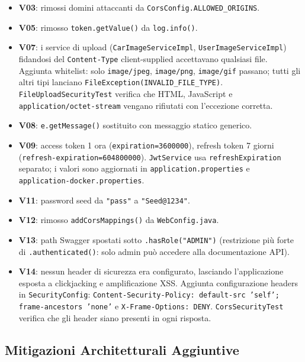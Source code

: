 \documentclass[12pt, a4paper]{article}
\begin{document}
    \begin{itemize}
        \item \textbf{V03}: rimossi domini attaccanti da \texttt{CorsConfig.ALLOWED\_ORIGINS}.
        \item \textbf{V05}: rimosso \texttt{token.getValue()} da \texttt{log.info()}.
        \item \textbf{V07}: i service di upload (\texttt{CarImageServiceImpl},
        \texttt{UserImageServiceImpl}) fidandosi del \texttt{Content-Type} client-supplied
        accettavano qualsiasi file. Aggiunta whitelist: solo \texttt{image/jpeg},
        \texttt{image/png}, \texttt{image/gif} passano; tutti gli altri tipi lanciano
        \texttt{FileException(INVALID\_FILE\_TYPE)}.
        \texttt{FileUploadSecurityTest} verifica che HTML, JavaScript e
        \texttt{application/octet-stream} vengano rifiutati con l'eccezione corretta.
        \item \textbf{V08}: \texttt{e.getMessage()} sostituito con messaggio statico generico.
        \item \textbf{V09}: access token 1 ora (\texttt{expiration=3600000}), refresh token 7 giorni (\texttt{refresh-expiration=604800000}). \texttt{JwtService} usa \texttt{refreshExpiration} separato; i valori sono aggiornati in \texttt{application.properties} e \texttt{application-docker.properties}.
        \item \textbf{V11}: password seed da \texttt{"pass"} a \texttt{"Seed@1234"}.
        \item \textbf{V12}: rimosso \texttt{addCorsMappings()} da \texttt{WebConfig.java}.
        \item \textbf{V13}: path Swagger spostati sotto \texttt{.hasRole("ADMIN")} (restrizione più forte di \texttt{.authenticated()}: solo admin può accedere alla documentazione API).
        \item \textbf{V14}: nessun header di sicurezza era configurato, lasciando l'applicazione
        esposta a clickjacking e amplificazione XSS. Aggiunta configurazione headers in
        \texttt{SecurityConfig}: \texttt{Content-Security-Policy: default-src 'self';
        frame-ancestors 'none'} e \texttt{X-Frame-Options: DENY}.
        \texttt{CorsSecurityTest} verifica che gli header siano presenti in ogni risposta.
    \end{itemize}

    \subsection{Mitigazioni Architetturali Aggiuntive}
\end{document}
